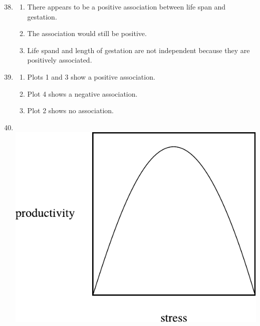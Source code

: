 \documentclass[12pt,letterpaper]{article}
\begin{document}
\begin{enumerate}
\setcounter{enumi}{37}

\item\begin{enumerate}
\item There appears to be a positive association between life span and gestation.
\item The association would still be positive.
\item Life spand and length of gestation are not independent because they are positively associated.
\end{enumerate}

\item\begin{enumerate}
\item Plots 1 and 3 show a positive association.
\item Plot 4 shows a negative association.
\item Plot 2 shows no association.
\end{enumerate}

\item ~ \\
\includegraphics[scale=0.5]{figures/productivity_vs_stress.pdf}


\end{enumerate}
\end{document}
